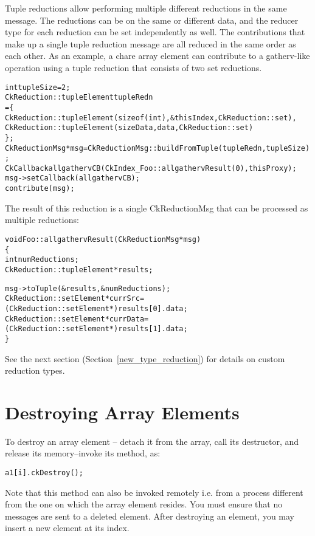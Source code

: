 Tuple reductions allow performing multiple different reductions in the
same message. The reductions can be on the same or different data, and
the reducer type for each reduction can be set independently as well.
The contributions that make up a single tuple reduction message are all
reduced in the same order as each other. As an example, a chare array
element can contribute to a gatherv-like operation using a tuple reduction
that consists of two set reductions.

\begin{alltt}
int tupleSize = 2;
CkReduction::tupleElement tupleRedn\[\] = \{
  CkReduction::tupleElement(sizeof(int), \&thisIndex, CkReduction::set),
  CkReduction::tupleElement(sizeData, data, CkReduction::set)
\};
CkReductionMsg* msg = CkReductionMsg::buildFromTuple(tupleRedn, tupleSize);
CkCallback allgathervCB(CkIndex\_Foo::allgathervResult(0), thisProxy);
msg->setCallback(allgathervCB);
contribute(msg);
\end{alltt}

The result of this reduction is a single CkReductionMsg that can be processed
as multiple reductions:

\begin{alltt}
void Foo::allgathervResult (CkReductionMsg* msg)
\{
  int numReductions;
  CkReduction::tupleElement* results;

  msg->toTuple(\&results, \&numReductions);
  CkReduction::setElement* currSrc  = (CkReduction::setElement*)results[0].data;
  CkReduction::setElement* currData = (CkReduction::setElement*)results[1].data;
\}
\end{alltt}

See the next section (Section~\ref{new_type_reduction}) for details on
custom reduction types.

\section{Destroying Array Elements}

To destroy an array element -- detach it from the array,
call its destructor, and release its memory--invoke its 
 method, as:

\begin{alltt}
a1[i].ckDestroy();
\end{alltt}

Note that this method can also be invoked remotely i.e. from 
a process different from the one on which the array element resides.
You must ensure that no messages are sent to a deleted element. 
After destroying an element, you may insert a new element at
its index. 
